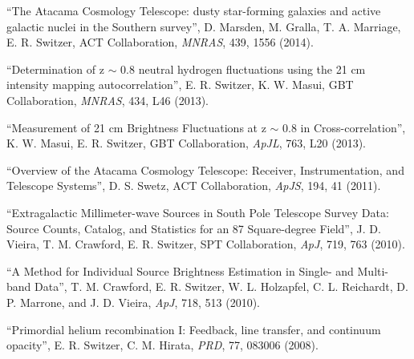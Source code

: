 \item ``The Atacama Cosmology Telescope: dusty star-forming galaxies and active galactic nuclei in the Southern survey'', D. Marsden, M. Gralla, T. A. Marriage, E. R. Switzer, ACT Collaboration, {\it MNRAS}, 439, 1556 (2014).
\item ``Determination of z $\sim$ 0.8 neutral hydrogen fluctuations using the 21 cm intensity mapping autocorrelation'', E. R. Switzer, K. W. Masui, GBT Collaboration, {\it MNRAS}, 434, L46 (2013).
\item ``Measurement of 21 cm Brightness Fluctuations at z $\sim$ 0.8 in Cross-correlation'', K. W. Masui, E. R. Switzer, GBT Collaboration, {\it ApJL}, 763, L20 (2013).
\item ``Overview of the Atacama Cosmology Telescope: Receiver, Instrumentation, and Telescope Systems'', D. S. Swetz, ACT Collaboration, {\it ApJS}, 194, 41 (2011).
\item ``Extragalactic Millimeter-wave Sources in South Pole Telescope Survey Data: Source Counts, Catalog, and Statistics for an 87 Square-degree Field'', J. D. Vieira, T. M. Crawford, E. R. Switzer, SPT Collaboration, {\it ApJ}, 719, 763 (2010).
\item ``A Method for Individual Source Brightness Estimation in Single- and Multi-band Data'', T. M. Crawford, E. R. Switzer, W. L. Holzapfel, C. L. Reichardt, D. P. Marrone, and J. D. Vieira, {\it ApJ}, 718, 513 (2010).
\item ``Primordial helium recombination I: Feedback, line transfer, and continuum opacity'', E. R. Switzer, C. M. Hirata, {\it PRD}, 77, 083006 (2008).

